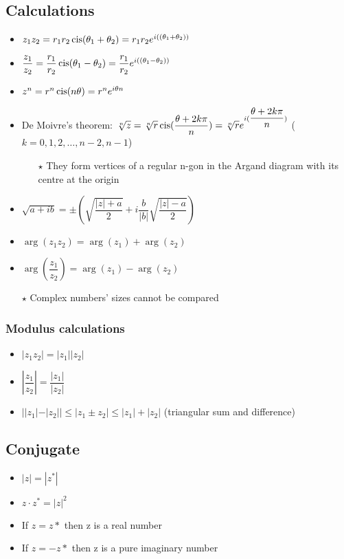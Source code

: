 \subsection{Calculations}
\begin{itemize}
	\item $z_1z_2=r_1r_2\operatorname{cis}(\theta_1+\theta_2)=r_1r_2e^{i((\theta_1+\theta_2))}$
	\item $\dfrac{z_1}{z_2}=\dfrac{r_1}{r_2}\operatorname{cis}(\theta_1-\theta_2)=\dfrac{r_1}{r_2}e^{i((\theta_1-\theta_2))}$
	\item $z^n = r^n\operatorname{cis}(n\theta)=r^ne^{i\theta n}$
	\item De Moivre's theorem: $\sqrt[n]{z}=\sqrt[n]{r}\operatorname{cis}(\dfrac{\theta+2k\pi}{n})=\sqrt[n]{r}e^{i(\dfrac{\theta+2k\pi}{n})}$ ($k=0,1,2,\dots,n-2,n-1$)
	\begin{itemize}
		\item[$\star$] They form vertices of a regular n-gon in the Argand diagram with its centre at the origin
	\end{itemize}
	\item $\sqrt{a+ib}=\pm(\sqrt{\dfrac{|z|+a}{2}}+i\dfrac{b}{|b|}\sqrt{\dfrac{|z|-a}{2}})$
	\item $\arg(z_1z_2)=\arg(z_1)+\arg(z_2)$
	\item $\arg(\dfrac{z_1}{z_2})=\arg(z_1)-\arg(z_2)$
	\item[$\star$] Complex numbers' sizes cannot be compared
\end{itemize}
\subsubsection{Modulus calculations}
\begin{itemize}
	\item $|z_1z_2|=|z_1||z_2|$
	\item $|\dfrac{z_1}{z_2}|=\dfrac{|z_1|}{|z_2|}$
	\item $||z_1|-|z_2|| \leq |z_1 \pm z_2| \leq |z_1|+|z_2|$ (triangular sum and difference)
\end{itemize}


\subsection{Conjugate}
\begin{itemize}
	\item $|z|=|z^*|$
	\item $z\cdot z^*= |z|^2$
	\item If $z=z*$ then z is a real number
	\item If $z=-z*$ then z is a pure imaginary number
\end{itemize}

